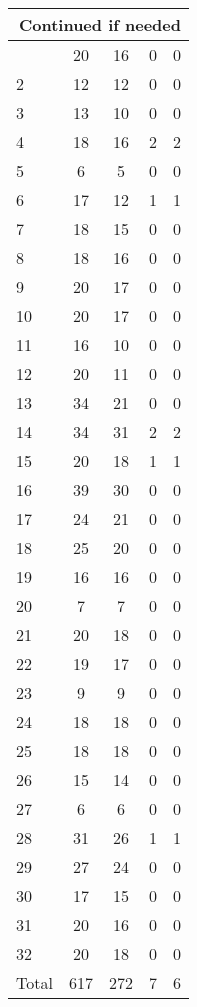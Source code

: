 \begin{center}
\begin{longtable}{l|c|c|c|c}
\hline \multicolumn{5}{|r|}{{Continued if needed}} \\ \hline
\endfoot 
1 & 20 & 16 & 0 & 0\\ \hline
2 & 12 & 12 & 0 & 0\\ \hline
3 & 13 & 10 & 0 & 0\\ \hline
4 & 18 & 16 & 2 & 2\\ \hline
5 & 6 & 5 & 0 & 0\\ \hline
6 & 17 & 12 & 1 & 1\\ \hline
7 & 18 & 15 & 0 & 0\\ \hline
8 & 18 & 16 & 0 & 0\\ \hline
9 & 20 & 17 & 0 & 0\\ \hline
10 & 20 & 17 & 0 & 0\\ \hline
11 & 16 & 10 & 0 & 0\\ \hline
12 & 20 & 11 & 0 & 0\\ \hline
13 & 34 & 21 & 0 & 0\\ \hline
14 & 34 & 31 & 2 & 2\\ \hline
15 & 20 & 18 & 1 & 1\\ \hline
16 & 39 & 30 & 0 & 0\\ \hline
17 & 24 & 21 & 0 & 0\\ \hline
18 & 25 & 20 & 0 & 0\\ \hline
19 & 16 & 16 & 0 & 0\\ \hline
20 & 7 & 7 & 0 & 0\\ \hline
21 & 20 & 18 & 0 & 0\\ \hline
22 & 19 & 17 & 0 & 0\\ \hline
23 & 9 & 9 & 0 & 0\\ \hline
24 & 18 & 18 & 0 & 0\\ \hline
25 & 18 & 18 & 0 & 0\\ \hline
26 & 15 & 14 & 0 & 0\\ \hline
27 & 6 & 6 & 0 & 0\\ \hline
28 & 31 & 26 & 1 & 1\\ \hline
29 & 27 & 24 & 0 & 0\\ \hline
30 & 17 & 15 & 0 & 0\\ \hline
31 & 20 & 16 & 0 & 0\\ \hline
32 & 20 & 18 & 0 & 0\\ \hline
\hline \hline
Total & 617 & 272 & 7 & 6




\end{longtable}
\end{center}

